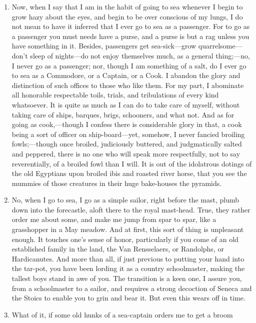 \documentclass{armymemo}
\begin{document}
\begin{enumerate}
\begin{enumerate}
  \item Now, when I say that I am in the habit of going to sea whenever I begin
    to grow hazy about the eyes, and begin to be over conscious of my lungs, I
    do not mean to have it inferred that I ever go to sea as a passenger. For to
    go as a passenger you must needs have a purse, and a purse is but a rag
    unless you have something in it. Besides, passengers get sea-sick—grow
    quarrelsome—don’t sleep of nights—do not enjoy themselves much, as a general
    thing;—no, I never go as a passenger; nor, though I am something of a salt,
    do I ever go to sea as a Commodore, or a Captain, or a Cook. I abandon the
    glory and distinction of such offices to those who like them. For my part, I
    abominate all honorable respectable toils, trials, and tribulations of every
    kind whatsoever. It is quite as much as I can do to take care of myself,
    without taking care of ships, barques, brigs, schooners, and what not.  And
    as for going as cook,—though I confess there is considerable glory in that,
    a cook being a sort of officer on ship-board—yet, somehow, I never fancied
    broiling fowls;—though once broiled, judiciously buttered, and judgmatically
    salted and peppered, there is no one who will speak more respectfully, not
    to say reverentially, of a broiled fowl than I will. It is out of the
    idolatrous dotings of the old Egyptians upon broiled ibis and roasted river
    horse, that you see the mummies of those creatures in their huge bake-houses
    the pyramids.
  \item No, when I go to sea, I go as a simple sailor, right before the mast,
    plumb down into the forecastle, aloft there to the royal mast-head.  True,
    they rather order me about some, and make me jump from spar to spar, like a
    grasshopper in a May meadow. And at first, this sort of thing is unpleasant
    enough. It touches one’s sense of honor, particularly if you come of an old
    established family in the land, the Van Rensselaers, or Randolphs, or
    Hardicanutes. And more than all, if just previous to putting your hand into
    the tar-pot, you have been lording it as a country schoolmaster, making the
    tallest boys stand in awe of you. The transition is a keen one, I assure
    you, from a schoolmaster to a sailor, and requires a strong decoction of
    Seneca and the Stoics to enable you to grin and bear it. But even this wears
    off in time.
  \item What of it, if some old hunks of a sea-captain orders me to get a broom

\end{enumerate}
\end{enumerate}
\end{document}
